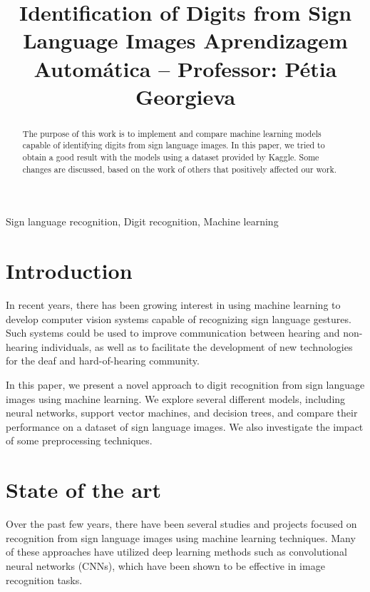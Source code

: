 \documentclass[conference]{IEEEtran}
\begin{document}
\title{Identification of Digits from Sign Language Images
{\small Aprendizagem Automática -- Professor: Pétia Georgieva}
}

\author{
\and
{}
}

\maketitle

\begin{abstract}
    The purpose of this work is to implement and
    compare machine learning models capable of identifying digits from sign language images.
    In this paper, we tried to obtain a good result with the models using
    a dataset provided by Kaggle. Some changes are discussed,
    based on the work of others that positively affected our
    work.
\end{abstract}

\begin{IEEEkeywords}
Sign language recognition, Digit recognition, Machine learning
\end{IEEEkeywords}

\section{Introduction}
In recent years, there has been growing interest in using machine learning to develop computer vision systems capable of recognizing sign language gestures. Such systems could be used to improve communication between hearing and non-hearing individuals, as well as to facilitate the development of new technologies for the deaf and hard-of-hearing community.

In this paper, we present a novel approach to digit recognition from sign language images using machine learning. We explore several different models, including neural networks, support vector machines, and decision trees, and compare their performance on a dataset of sign language images. We also investigate the impact of some preprocessing techniques.


\section{State of the art}
Over the past few years, there have been several studies and projects focused on recognition from sign language images using machine learning techniques. Many of these approaches\cite{b2}
have utilized deep learning methods such as convolutional neural networks (CNNs), which have been shown to be effective in image recognition tasks\cite{b3}\cite{b4}.
\end{document}
